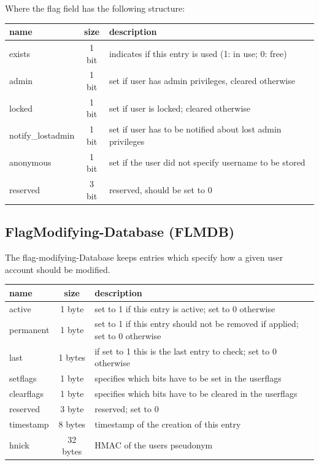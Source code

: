 Where the flag field has the following structure: \\
\begin{tabular}{|l|c|l|} \hline
name & size & description \\ \hline 
exists            & 1 bit    &  indicates if this entry is used (1: in use; 0: free)\\
admin             & 1 bit & set if user has admin privileges, cleared otherwise \\
locked            & 1 bit & set if user is locked; cleared otherwise \\
notify\_lostadmin & 1 bit & set if user has to be notified about lost admin privileges \\
anonymous         & 1 bit & set if the user did not specify username to be stored \\
reserved          & 3 bit & reserved, should be set to 0\\ \hline
\end{tabular} 


\subsection{FlagModifying-Database (FLMDB)}
The flag-modifying-Database keeps entries which specify how a given user account should be modified. \\
\begin{tabular}{|l|c|p{8cm}|} \hline
name & size & description \\ \hline 
active     & 1 byte    & set to 1 if this entry is active; set to 0 otherwise \\
permanent  & 1 byte & set to 1 if this entry should not be removed if applied; set to 0 otherwise \\
last       & 1 bytes & if set to 1 this is the last entry to check; set to 0 otherwise \\ 
setflags   & 1 byte & specifies which bits have to be set in the userflags\\
clearflags & 1 byte & specifies which bits have to be cleared in the userflags\\
reserved   & 3 byte & reserved; set to 0\\
timestamp  & 8 bytes & timestamp of the creation of this entry\\
hnick      & 32 bytes & HMAC of the users pseudonym\\
\hline
\end{tabular}

